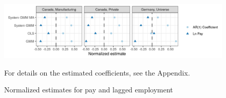 \begin{figure} [H]
\centering
\includegraphics[width=\linewidth]{r-graphs/fig_estimates3.png}
\caption{Normalized estimates for pay and lagged employment\label{fig:estimates3}} 
\begin{minipage}{0.48\linewidth}
{\footnotesize For details on the estimated coefficients, see the Appendix. \par}
\end{minipage}
\end{figure}
